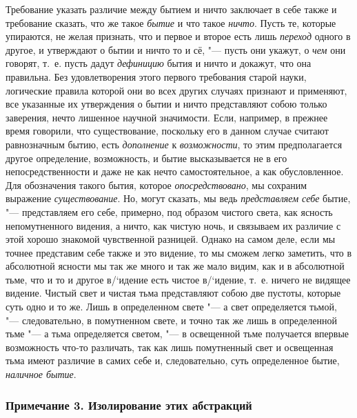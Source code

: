 Требование указать различие между бытием и ничто заключает в себе также и
требование сказать, что же такое {\em бытие} и что
такое {\em ничто}. Пусть те, которые упираются, не
желая признать, что и первое и второе есть лишь
{\em переход} одного в другое, и утверждают о бытии и
ничто то и сё, "--- пусть они укажут, о {\em чем} они
говорят, т.~е. пусть дадут {\em дефиницию} бытия и
ничто и докажут, что она правильна. Без удовлетворения этого первого
требования старой науки, логические правила которой они во всех других
случаях признают и применяют, все указанные их утверждения о бытии и ничто
представляют собою только заверения, нечто лишенное научной значимости.
Если, например, в прежнее время говорили, что существование, поскольку его
в данном случае считают равнозначным бытию, есть
{\em дополнение} к
{\em возможности}, то этим предполагается другое
определение, возможность, и бытие высказывается не в его непосредственности
и даже не как нечто самостоятельное, а как обусловленное. Для обозначения
такого бытия, которое {\em опосредствовано}, мы
сохраним выражение {\em существование}. Но, могут
сказать, мы ведь {\em представляем себе} бытие, "---
представляем его себе, примерно, под образом чистого света, как ясность
непомутненного видения, а ничто, как чистую ночь, и связываем их различие с
этой хорошо знакомой чувственной разницей. Однако на самом деле, если мы
точнее представим себе также и это видение, то мы сможем легко заметить,
что в абсолютной ясности мы так же много и так же мало видим, как и в
абсолютной тьме, что и то и другое в/`{и}дение есть чистое в/`{и}дение, т.~е.
ничего не видящее видение. Чистый свет и чистая тьма представляют собою две
пустоты, которые суть одно и то же. Лишь в определенном свете "--- а свет
определяется тьмой, "--- следовательно, в помутненном свете, и точно так же
лишь в определенной тьме "--- а тьма определяется светом, "--- в освещенной тьме
получается впервые возможность что-то различать, так как лишь помутненный
свет и освещенная тьма имеют различие в самих себе и, следовательно, суть
определенное бытие, {\em наличное бытие}.


\subsubsection[Примечание 3. Изолирование этих абстракций]
{Примечание 3. Изолирование этих абстракций}

